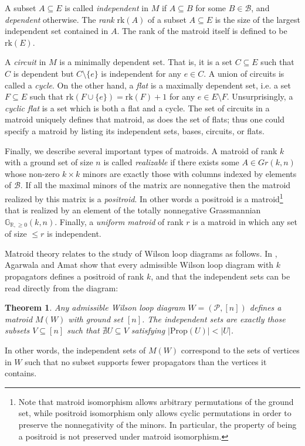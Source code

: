\documentclass[11pt]{article}
\newcommand{\R}{\mathbb{R}}
\newcommand{\Gr}{\mathbb{G}_{\R, \geq 0}}
\newcommand{\rk}{\textrm{rk} }
\newcommand{\cP}{\mathcal{P}}
\newcommand{\cB}{\mathcal{B}}
\newcommand{\Prop}{\textrm{Prop}}
\newtheorem{thm}{Theorem}[section]
\theoremstyle{remark}
\theoremstyle{definition}
\begin{document}
A subset $A \subseteq E$ is called {\em independent} in $M$ if $A \subseteq B$ for some $B \in \cB$, and {\em dependent} otherwise. The {\em rank}  $\rk(A)$ of a subset $A \subseteq E$ is the size of the largest independent set contained in $A$. The rank of the matroid itself is defined to be $\rk(E)$.

A {\em circuit} in $M$ is a minimally dependent set. That is, it is a set $C \subseteq E$ such that $C$ is dependent but $C \setminus \{e\}$ is independent for any $e \in C$. A union of circuits is called a {\em cycle}. On the other hand, a {\em flat} is a maximally dependent set, i.e. a set $F \subseteq E$ such that $\rk(F \cup \{e\}) = \rk(F) + 1$ for any $e \in E \setminus F$. Unsurprisingly, a {\em cyclic flat} is a set which is both a flat and a cycle. The set of circuits in a matroid uniquely defines that matroid, as does the set of flats; thus one could specify a matroid by listing its independent sets, bases, circuits, or flats.

Finally, we describe several important types of matroids. A matroid of rank $k$ with a ground set of size $n$ is called {\em realizable} if there exists some $A \in Gr(k,n)$ whose non-zero $k\times k$ minors are exactly those with columns indexed by elements of $\cB$. If all the maximal minors of the matrix are nonnegative then the matroid realized by this matrix is a {\em positroid}.  In other words a positroid is a matroid\footnote{Note that matroid isomorphism allows arbitrary permutations of the ground set, while positroid isomorphism only allows cyclic permutations in order to preserve the nonnegativity of the minors.  In particular, the property of being a positroid is not preserved under matroid isomorphism.} that is realized by an element of the totally nonnegative Grassmannian $\Gr(k,n)$. Finally, a {\em uniform matroid} of rank $r$ is a matroid in which any set of size $\leq r$ is independent.

Matroid theory relates to the study of Wilson loop diagrams as follows. In \cite{wilsonloop}, Agarwala and Amat show that every admissible Wilson loop diagram with $k$ propagators defines a positroid of rank $k$, and that the independent sets can be read directly from the diagram:

\begin{thm} \label{thm WLD defines matroid} \cite[Theorem 3.6]{wilsonloop} Any admissible Wilson loop diagram $W =(\cP, [n])$ defines a matroid $M(W)$ with ground set $[n]$. The independent sets are exactly those subsets $V \subseteq [n]$ such that $\nexists U\subseteq V$ satisfying $|\Prop(U)| < |U|$. \label{thm:WLDmatroid}\end{thm}
In other words, the independent sets of $M(W)$ correspond to the sets of vertices in $W$ such that no subset supports fewer propagators than the vertices it contains.
\end{document}
